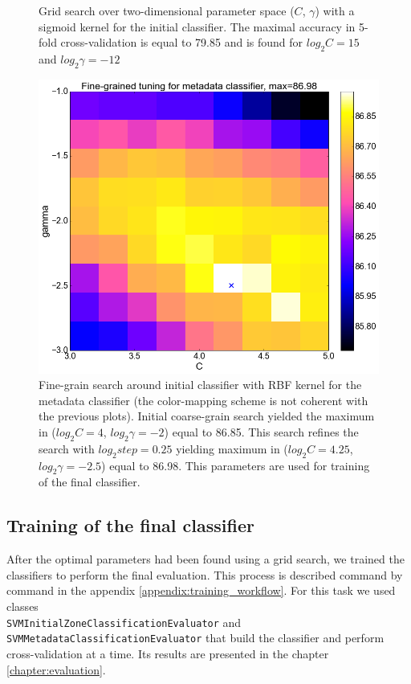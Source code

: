 \begin{center}
\begin{figure}
  \caption{Grid search over two-dimensional parameter space ($C$, $\gamma$) with a sigmoid kernel for the initial classifier. The maximal accuracy in 5-fold cross-validation is equal to 79.85 and is found for $log_{2}C=15$ and $log_{2}\gamma=-12$}
  \label{fig:meta_sigmoid}
\end{figure}
\begin{figure}
	\centering
  \includegraphics[width=\textwidth]{plots/meta_fine}
  \caption{Fine-grain search around initial classifier with RBF kernel for the metadata classifier (the color-mapping scheme is not coherent with the previous plots). Initial coarse-grain search yielded the maximum in ($log_{2}C=4$, $log_{2}\gamma=-2$) equal to 86.85. This search refines the search with $log_{2}step=0.25$ yielding maximum in ($log_{2}C=4.25$, $log_{2}\gamma=-2.5$) equal to 86.98. This parameters are used for training of the final classifier.}
  \label{fig:meta_fine}
\end{figure}
\end{center}

\subsection{Training of the final classifier}
After the optimal parameters had been found using a grid search, we trained the classifiers to perform the final evaluation. This process is described command by command in the appendix \ref{appendix:training_workflow}. For this task we used classes \\ \verb+SVMInitialZoneClassificationEvaluator+ and \\ \verb+SVMMetadataClassificationEvaluator+ that build the classifier and perform cross-validation at a time. Its results are presented in the chapter \ref{chapter:evaluation}.


